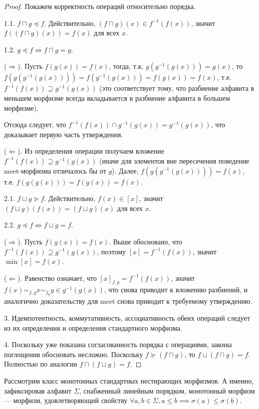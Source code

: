\documentclass[fontsize=14pt]{scrartcl}
\begin{document}
\begin{proof}

    Покажем корректность операций относительно порядка.

    1.1. $f \sqcap g \preceq f$. Действительно, $(f \sqcap g)(x) \in f^{-1}(f(x))$, значит $f((f \sqcap g)(x)) = f(x)$ для всех $x$.

    1.2. $g \preceq f \iff f \sqcap g = g$. 

    ($\Rightarrow$). Пусть $f(g(x)) = f(x)$, тогда, т.к. $g(g^{-1}(g(x))) = g(x)$, то $f(g(g^{-1}(g(x)))) = f(g^{-1}(g(x))) = f(g(x)) = f(x)$, т.е.
    $f^{-1}(f(x)) \supseteq g^{-1}(g(x))$ (это соответствует тому, что разбиение алфавита в меньшем морфизме всегда вкладывается в разбиение алфавита в большем морфизме).

    Отсюда следует, что $f^{-1}(f(x)) \cap g^{-1}(g(x)) = g^{-1}(g(x))$, что доказывает первую часть утверждения.

    ($\Leftarrow$). Из определения операции получаем вложение $f^{-1}(f(x)) \supseteq g^{-1}(g(x))$ (иначе для элементов вне пересечения поведение meet-морфизма отличалось бы от $g$).
    Далее, $f(g(g^{-1}(g(x)))) = f(x)$, т.е. $f(g(g(x))) = f(g(x)) = f(x)$.

    2.1. $f \sqcup g \succeq f$. Действительно, $f(x) \in [x]$, значит $(f \sqcup g)(f(x)) = (f \sqcup g)(x)$ для всех $x$.

    2.2. $g \preceq f \iff f \sqcup g = f$. 

    ($\Rightarrow$). Пусть $f(g(x)) = f(x)$. Выше обосновано, что $f^{-1}(f(x)) \supseteq g^{-1}(g(x))$, поэтому $[x] = f^{-1}(f(x))$, значит $\min[x] = f(x)$.

    ($\Leftarrow$). Равенство означает, что $[x]_{f,g} = f^{-1}(f(x))$, значит $f(x) \sim_{f,g} x \sim_{f_g} y \in g^{-1}(g(x))$, что снова приводит к вложению разбиений, и
    аналогично доказательству для meet снова приводит к требуемому утверждению. 

    3. Идемпотентность, коммутативность, ассоциативность обеих операций следует из их определения и определения стандартного морфизма.

    4. Поскольку уже показана согласованность порядка с операциями, законы поглощения обосновать несложно.
    Поскольку $f \succeq (f \sqcap g) $, то $f \sqcup (f \sqcap g) = f$. Полностью по аналогии $f \sqcap (f \sqcup g) = f$.
\end{proof}


Рассмотрим класс монотонных стандартных нестирающих морфизмов. А именно,
зафиксировав алфавит $\Sigma$, снабженный линейным порядком, монотонный морфизм ---
морфизм, удовлетворяющий свойству $\forall a, b \in \Sigma, a \leq b \implies \sigma(a) \leq \sigma(b)$.
\end{document}
